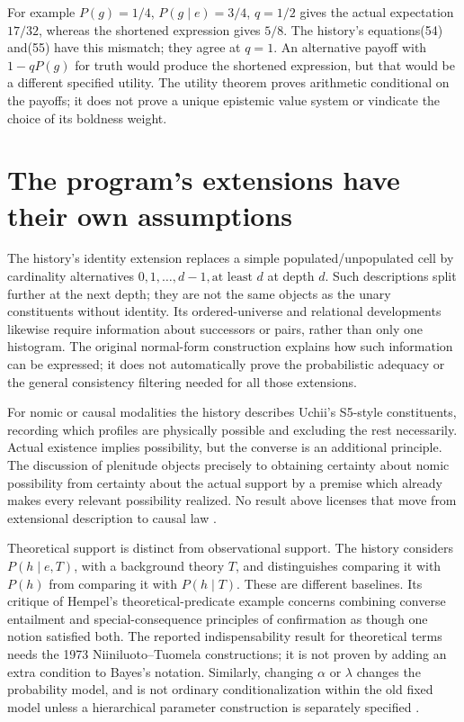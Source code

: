 For example \(P(g)=1/4\), \(P(g\mid e)=3/4\),
\(q=1/2\) gives the actual expectation \(17/32\), whereas
the shortened expression gives \(5/8\). The history's equations(54)
and(55) have this mismatch; they agree at \(q=1\).
An alternative payoff with \(1-qP(g)\) for truth would produce
the shortened expression, but that would be a different specified
utility. The utility theorem proves arithmetic conditional on the
payoffs; it does not prove a unique epistemic value system or vindicate
the choice of its boldness weight.

\section{The program's extensions have their own assumptions}
\label{sec:p15-hintikka-extensions}

The history's identity extension replaces a simple populated/unpopulated
cell by cardinality alternatives \(0,1,\ldots,d-1,\text{at least }d\)
at depth \(d\). Such descriptions split further at the next depth;
they are not the same objects as the unary constituents without
identity. Its ordered-universe and relational developments likewise
require information about successors or pairs, rather than only one
histogram. The original normal-form construction explains how such
information can be expressed; it does not automatically prove the
probabilistic adequacy or the general consistency filtering needed for
all those extensions.

For nomic or causal modalities the history describes Uchii's S5-style
constituents, recording which profiles are physically possible and
excluding the rest necessarily. Actual existence implies possibility,
but the converse is an additional principle. The discussion of
plenitude objects precisely to obtaining certainty about nomic
possibility from certainty about the actual support by a premise which
already makes every relevant possibility realized. No result above
licenses that move from extensional description to causal law
\cite[sec.~4, pp.~326--329]{Niiniluoto2011HintikkaProgramReading}.

Theoretical support is distinct from observational support. The history
considers \(P(h\mid e,T)\), with a background theory \(T\),
and distinguishes comparing it with \(P(h)\) from comparing it with
\(P(h\mid T)\). These are different baselines. Its critique of
Hempel's theoretical-predicate example concerns combining converse
entailment and special-consequence principles of confirmation as though
one notion satisfied both. The reported indispensability result for
theoretical terms needs the 1973 Niiniluoto--Tuomela constructions;
it is not proven by adding an extra condition to Bayes's notation.
Similarly, changing \(\alpha\) or \(\lambda\) changes the
probability model, and is not ordinary conditionalization within the
old fixed model unless a hierarchical parameter construction is
separately specified
\cite[sec.~8, pp.~337--340]{Niiniluoto2011HintikkaProgramReading}.

